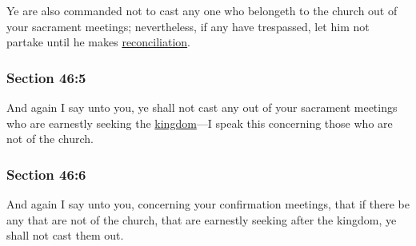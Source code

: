 		Ye are also commanded not to cast any one who belongeth to the church out of your sacrament meetings; nevertheless, if any have trespassed, let him not partake until he makes \hyperref[RECONCILIATION]{reconciliation}.


	\subsubsection{Section 46:5} %
		\label{DC46-5}

		And again I say unto you, ye shall not cast any out of your sacrament meetings who are earnestly seeking the \hyperref[KINGDOM]{kingdom}---I speak this concerning those who are not of the church.


	\subsubsection{Section 46:6} %
		\label{DC46-6}

		And again I say unto you, concerning your confirmation meetings, that if there be any that are not of the church, that are earnestly seeking after the kingdom, ye shall not cast them out.


